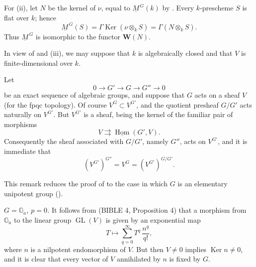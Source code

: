 For (ii), let \(N\) be the kernel of \(\nu\), equal to
\(\underline M^{\,G}(k)\) by .  Every \(k\)-prescheme \(S\) is flat
over \(k\); hence
\[
  \underline M^{\,G}(S)
  =\Gamma\operatorname{Ker}(\nu\otimes_k S)
  =\Gamma(N\otimes_k S).
\]
Thus \(\underline M^{\,G}\) is isomorphic to the functor
\(\mathbf W(N)\).




In view of  and (iii), we may suppose that \(k\) is
algebraically closed and that \(V\) is finite-dimensional over \(k\).

Let
\[
  0\longrightarrow G'\longrightarrow G\longrightarrow G''
    \longrightarrow0
\]
be an exact sequence of algebraic groups, and suppose that \(G\) acts
on a sheaf \(V\) (for the fpqc topology).  Of course
\(V^G\subset V^{G'}\), and the quotient presheaf \(G/G'\) acts
naturally on \(V^{G'}\).  But \(V^{G'}\) is a sheaf, being the kernel
of the familiar pair of morphisms
\[
  V\rightrightarrows\underline{\operatorname{Hom}}(G',V).
\]
Consequently the sheaf associated with \(G/G'\), namely \(G''\),
acts on \(V^{G'}\), and it is immediate that
\[
  \left(V^{G'}\right)^{G''}
  =V^G
  =\left(V^{G'}\right)^{G/G'}.
\]

This remark reduces the proof of  to the case in which \(G\) is an
elementary unipotent group ().

\textit{ \(G=\mathbb G_a\), \(p=0\).}
It follows from (BIBLE 4, Proposition 4) that a morphism from
\(\mathbb G_a\) to the linear group \(\operatorname{GL}(V)\) is given
by an exponential map
\[
  T\longmapsto\sum_{q=0}^{\infty}T^q\,\frac{n^q}{q!},
\]
where \(n\) is a nilpotent endomorphism of \(V\).  But then
\(V\ne0\) implies \(\operatorname{Ker}n\ne0\), and it is clear that
every vector of \(V\) annihilated by \(n\) is fixed by \(G\).

